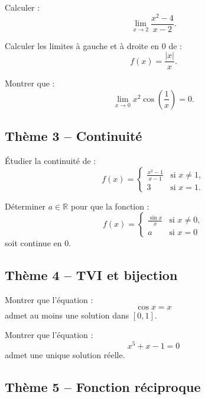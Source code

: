 \documentclass[11pt,a4paper]{article}
\newcommand{\R}{\mathbb R}
\begin{document}
\begin{exercicebox}[4]
Calculer :
\[
\lim_{x\to2}\frac{x^2-4}{x-2}.
\]
\end{exercicebox}

\begin{exercicebox}[5]
Calculer les limites à gauche et à droite en \(0\) de :
\[
f(x)=\frac{|x|}{x}.
\]
\end{exercicebox}

\begin{exercicebox}[6]
Montrer que :
\[
\lim_{x\to0}x^2\cos\left(\frac1x\right)=0.
\]
\end{exercicebox}

\subsection*{Thème 3 -- Continuité}

\begin{exercicebox}[7]
Étudier la continuité de :
\[
f(x)=
\begin{cases}
\frac{x^2-1}{x-1} & \text{si }x\neq1,\\
3 & \text{si }x=1.
\end{cases}
\]
\end{exercicebox}

\begin{exercicebox}[8]
Déterminer \(a\in\R\) pour que la fonction :
\[
f(x)=
\begin{cases}
\frac{\sin x}{x} & \text{si }x\neq0,\\
a & \text{si }x=0
\end{cases}
\]
soit continue en \(0\).
\end{exercicebox}

\subsection*{Thème 4 -- TVI et bijection}

\begin{exercicebox}[9]
Montrer que l'équation :
\[
\cos x=x
\]
admet au moins une solution dans \([0,1]\).
\end{exercicebox}

\begin{exercicebox}[10]
Montrer que l'équation :
\[
x^5+x-1=0
\]
admet une unique solution réelle.
\end{exercicebox}

\subsection*{Thème 5 -- Fonction réciproque}
\end{document}
